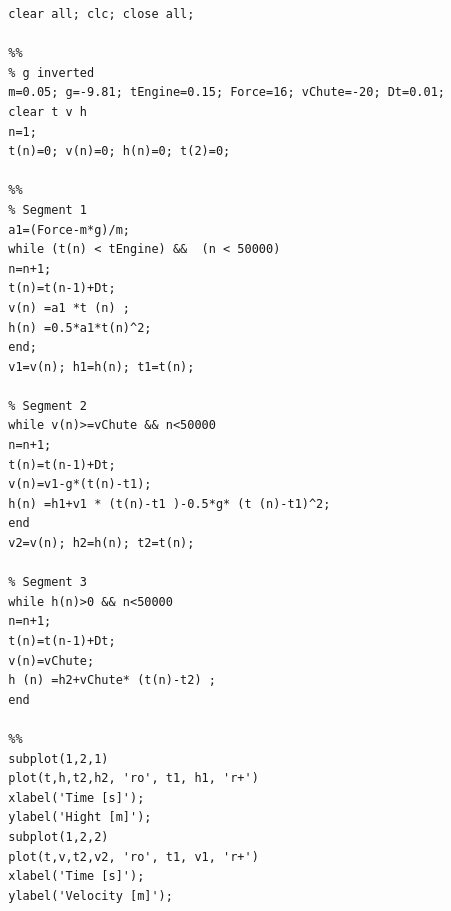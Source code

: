 	
	
	

	\begin{lstlisting}
		clear all; clc; close all;
		
		%%
		% g inverted
		m=0.05; g=-9.81; tEngine=0.15; Force=16; vChute=-20; Dt=0.01; 
		clear t v h 
		n=1; 
		t(n)=0; v(n)=0; h(n)=0; t(2)=0;
		
		%%
		% Segment 1 
		a1=(Force-m*g)/m; 
		while (t(n) < tEngine) &&  (n < 50000) 
		n=n+1; 
		t(n)=t(n-1)+Dt; 
		v(n) =a1 *t (n) ; 
		h(n) =0.5*a1*t(n)^2;
		end;
		v1=v(n); h1=h(n); t1=t(n);
		
		% Segment 2
		while v(n)>=vChute && n<50000
		n=n+1;
		t(n)=t(n-1)+Dt;
		v(n)=v1-g*(t(n)-t1);
		h(n) =h1+v1 * (t(n)-t1 )-0.5*g* (t (n)-t1)^2;
		end
		v2=v(n); h2=h(n); t2=t(n);
		
		% Segment 3
		while h(n)>0 && n<50000
		n=n+1;
		t(n)=t(n-1)+Dt;
		v(n)=vChute;
		h (n) =h2+vChute* (t(n)-t2) ;
		end
		
		%%
		subplot(1,2,1)
		plot(t,h,t2,h2, 'ro', t1, h1, 'r+')
		xlabel('Time [s]');
		ylabel('Hight [m]');
		subplot(1,2,2)
		plot(t,v,t2,v2, 'ro', t1, v1, 'r+')
		xlabel('Time [s]');
		ylabel('Velocity [m]');
	\end{lstlisting}